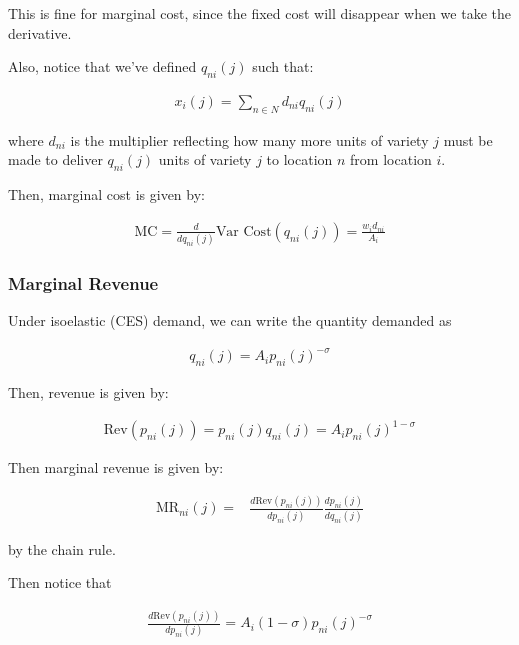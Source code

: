 \documentclass[10pt]{article}
\begin{document}
This is fine for marginal cost, since the fixed cost 
will disappear when we take the derivative.

Also, notice that we've defined $q_{ni}(j)$ such that:

\begin{align}
    x_i(j) = \sum_{n \in N} d_{ni} q_{ni}(j) \label{eq:xij_qnij}
\end{align}

where $d_{ni}$ is the multiplier reflecting 
how many more units of variety $j$ must be made 
to deliver $q_{ni}(j)$ units of variety $j$ to location $n$
from location $i$.

Then, marginal cost is given by:

\begin{align}
    \text{MC} = \frac{d}{d q_{ni}(j)} \text{Var Cost}\left(q_{ni}(j)\right)= \frac{w_i d_{ni}}{A_i}
\end{align}

\subsubsection{Marginal Revenue}

Under isoelastic (CES) demand, 
we can write the quantity demanded as

\begin{align}
    q_{ni}(j)=A_i p_{n i}(j)^{-\sigma} 
\end{align}

Then, revenue is given by:

\begin{align}
    \text{Rev}(p_{n i}(j)) = p_{n i}(j) q_{ni}(j) = A_i p_{n i}(j)^{1-\sigma}
\end{align}

Then marginal revenue is given by:

\begin{align}
    \text{MR}_{n i}(j) = &\frac{d \text{Rev}(p_{n i}(j))}{dp_{n i}(j)} \frac{d p_{n i}(j)}{d q_{ni}(j)} \label{eq:mr_ni_1}
\end{align}

by the chain rule.

Then notice that

\begin{align}
    \frac{d \text{Rev}(p_{n i}(j))}{dp_{n i}(j)} = A_i (1-\sigma) p_{n i}(j)^{-\sigma} \label{eq:drev_dp}
\end{align}
\end{document}
